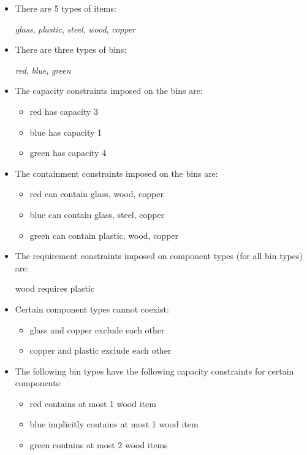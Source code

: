 \begin{itemize}
\item There are 5 types of items:

        {\em glass}, {\em plastic}, {\em steel}, {\em wood}, {\em copper}

\item There are three types of bins:

        {\em red}, {\em blue}, {\em green}

\item        The capacity constraints imposed on the bins are:

\begin{itemize}
\item        red   has capacity 3
\item        blue  has capacity 1
\item        green has capacity 4
\end{itemize}

\item The containment constraints imposed on the bins are:
\begin{itemize}
\item        red   can contain glass, wood, copper
\item        blue  can contain glass, steel, copper
\item        green can contain plastic, wood, copper
\end{itemize}

\item  The requirement constraints imposed on component types (for all bin
  types) are:

        wood requires plastic

\item Certain component types cannot coexist:

\begin{itemize}
\item        glass and copper exclude each other
\item        copper and plastic exclude each other
\end{itemize}

\item The following bin types have the following capacity constraints for certain
components:

\begin{itemize}
\item red   contains at most 1 wood item
\item blue  implicitly contains at most 1 wood item
\item green contains at most 2 wood items
\end{itemize}


\end{itemize}
